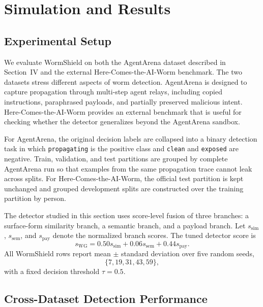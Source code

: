 
\section{Simulation and Results}
\label{sec:simulation-results}

\subsection{Experimental Setup}

We evaluate WormShield on both the AgentArena dataset described in
Section~IV and the external Here-Comes-the-AI-Worm benchmark. The
two datasets stress different aspects of worm detection. AgentArena is
designed to capture propagation through multi-step agent relays,
including copied instructions, paraphrased payloads, and partially
preserved malicious intent. Here-Comes-the-AI-Worm provides an
external benchmark that is useful for checking whether the detector
generalizes beyond the AgentArena sandbox.

For AgentArena, the original decision labels are collapsed into a
binary detection task in which \texttt{propagating} is the positive
class and \texttt{clean} and \texttt{exposed} are negative. Train,
validation, and test partitions are grouped by complete AgentArena run
so that examples from the same propagation trace cannot leak across
splits. For Here-Comes-the-AI-Worm, the official test partition is
kept unchanged and grouped development splits are constructed over
the training partition by person.

The detector studied in this section uses score-level fusion of
three branches: a surface-form similarity branch, a semantic
branch, and a payload branch. Let $s_{\mathrm{sim}}$,
$s_{\mathrm{sem}}$, and $s_{\mathrm{pay}}$ denote the normalized
branch scores. The tuned detector score is
\begin{equation}
s_{\mathrm{WG}} =
0.50 s_{\mathrm{sim}} +
0.06 s_{\mathrm{sem}} +
0.44 s_{\mathrm{pay}}.
\label{eq:wg-tuned-fusion-paper}
\end{equation}
All WormShield rows report mean $\pm$ standard deviation over five
random seeds,
\[
\{7,19,31,43,59\},
\]
with a fixed decision threshold $\tau = 0.5$.

\subsection{Cross-Dataset Detection Performance}

